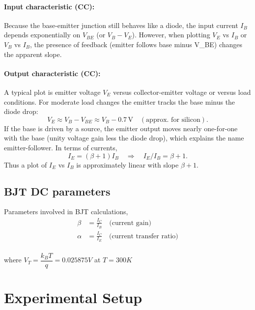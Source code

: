\documentclass[12pt,a4paper]{article}
\begin{document}
\paragraph{Input characteristic (CC):}
Because the base-emitter junction still behaves like a diode, the input current $I_B$ depends exponentially on $V_{BE}$ (or $V_B-V_E$). However, when plotting $V_E$ vs $I_B$ or $V_B$ vs $I_B$, the presence of feedback (emitter follows base minus V_{BE}) changes the apparent slope.

\paragraph{Output characteristic (CC):}
A typical plot is emitter voltage $V_E$ versus collector-emitter voltage or versus load conditions. For moderate load changes the emitter tracks the base minus the diode drop:
\begin{equation}
  V_E \approx V_B - V_{BE} \approx V_B - 0.7\,\text{V} \quad (\text{approx. for silicon}).\label{eq:emitter_follow}
\end{equation}
If the base is driven by a source, the emitter output moves nearly one-for-one with the base (unity voltage gain less the diode drop), which explains the name emitter-follower. In terms of currents,
\begin{equation}
  I_E = (\beta+1) I_B\quad\Rightarrow\quad I_E/I_B = \beta+1.\label{eq:ie_ib}
\end{equation}
Thus a plot of $I_E$ vs $I_B$ is approximately linear with slope $\beta+1$.



\subsection{BJT DC parameters}
Parameters involved in BJT calculations,
\begin{align}
\beta &= \frac{I_C}{I_B} \quad \text{(current gain)} \\
\alpha &= \frac{I_C}{I_E} \quad \text{(current transfer ratio)} \\
\end{align}

where \(V_T = \dfrac{k_B T}{q} = {0.025875}V\) at $T=300K$
\pagebreak

\section{Experimental Setup}
\end{document}

